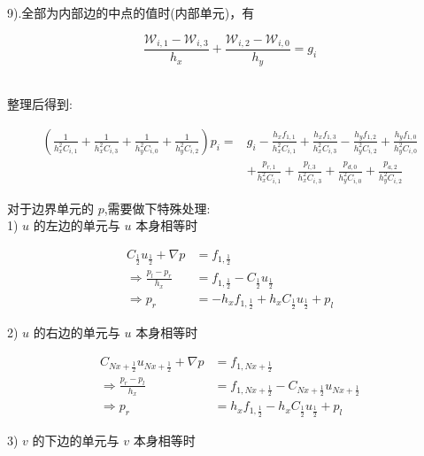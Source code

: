 \documentclass[leqno]{article}
\begin{document}
9).全部为内部边的中点的值时(内部单元)，有

\begin{equation*}
\frac{ \mathcal{W}_{i,1} - \mathcal{W}_{i,3}}{h_x} + \frac{ \mathcal{W}_{i,2} - \mathcal{W}_{i,0}}{h_y} = g_i
\end{equation*}　

整理后得到:

\begin{equation*}
\begin{aligned}
(\frac{1}{h_x^2C_{i,1}} + \frac{1}{h_x^2C_{i,3}} + \frac{1}{h_y^2C_{i,0}} + \frac{1}{h_y^2C_{i,2}})p_i =& g_i - \frac{h_xf_{1,1}}{h_x^2C_{i,1}} + \frac{h_xf_{1,3}}{h_x^2C_{i,3}} - \frac{h_yf_{1,2}}{h_y^2C_{i,2}} + \frac{h_yf_{1,0}}{h_y^2C_{i,0}}\\
& + \frac{p_{r,1}}{h_x^2C_{i,1}} + \frac{p_{l,3}}{h_x^2C_{i,3}} + \frac{p_{d,0}}{h_y^2C_{i,0}} + \frac{p_{a,2}}{h_y^2C_{i,2}}
\end{aligned}
\end{equation*}

对于边界单元的 $p$,需要做下特殊处理:\\

1) $u$ 的左边的单元与 $u$ 本身相等时

\begin{equation*}
\begin{aligned}
C_{\frac{1}{2}}u_{\frac{1}{2}} + \nabla p & = f_{1,\frac{1}{2}}\\
\Rightarrow \frac{p_l - p_r}{h_x} & = f_{1,\frac{1}{2}} - C_{\frac{1}{2}}u_{\frac{1}{2}} \\
\Rightarrow p_r & = - h_xf_{1,\frac{1}{2}} + h_xC_{\frac{1}{2}}u_{\frac{1}{2}} + p_l
\end{aligned}
\end{equation*} 

2) $u$ 的右边的单元与 $u$ 本身相等时

\begin{equation*}
\begin{aligned}
C_{Nx+\frac{1}{2}}u_{Nx+\frac{1}{2}} + \nabla p & = f_{1,Nx+\frac{1}{2}}\\
\Rightarrow \frac{p_r - p_l}{h_x} & = f_{1,Nx+\frac{1}{2}} - C_{Nx+\frac{1}{2}}u_{Nx+\frac{1}{2}} \\
\Rightarrow p_r & =  h_xf_{1,\frac{1}{2}} - h_xC_{\frac{1}{2}}u_{\frac{1}{2}} + p_l
\end{aligned}
\end{equation*} 

3) $v$ 的下边的单元与 $v$ 本身相等时
\end{document}
